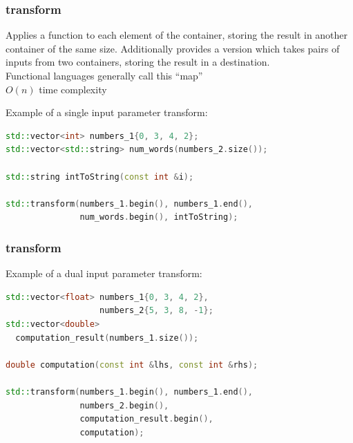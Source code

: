 \documentclass{beamer}
\begin{document}
\begin{frame}[fragile]
  \frametitle{transform}
  Applies a function to each element of the container,
  storing the result in another container of the same size.
  Additionally provides a version which takes pairs of inputs from two containers,
  storing the result in a destination.\\
  Functional languages generally call this ``map''\\
  $O(n)$ time complexity

  Example of a single input parameter transform:
  \begin{lstlisting}[language=C++]
std::vector<int> numbers_1{0, 3, 4, 2};
std::vector<std::string> num_words(numbers_2.size());

std::string intToString(const int &i);

std::transform(numbers_1.begin(), numbers_1.end(),
               num_words.begin(), intToString);
  \end{lstlisting}
\end{frame}

\begin{frame}[fragile]
  \frametitle{transform}
  Example of a dual input parameter transform:
  \begin{lstlisting}[language=C++]
std::vector<float> numbers_1{0, 3, 4, 2},
                   numbers_2{5, 3, 8, -1};
std::vector<double>
  computation_result(numbers_1.size());

double computation(const int &lhs, const int &rhs);

std::transform(numbers_1.begin(), numbers_1.end(),
               numbers_2.begin(),
               computation_result.begin(),
               computation);
  \end{lstlisting}
\end{frame}



\end{document}
